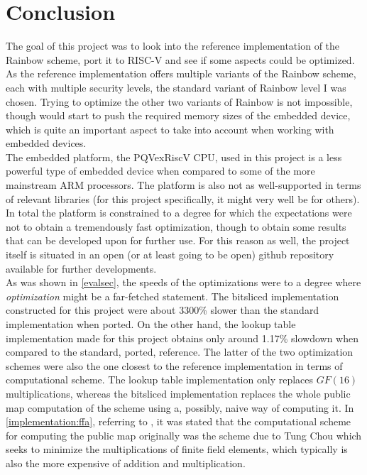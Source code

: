 \section{Conclusion}
The goal of this project was to look into the reference implementation of the Rainbow scheme, port it to RISC-V and see if some aspects could be optimized. As the reference implementation offers multiple variants of the Rainbow scheme, each with multiple security levels, the standard variant of Rainbow level I was chosen. Trying to optimize the other two variants of Rainbow is not impossible, though would start to push the required memory sizes of the embedded device, which is quite an important aspect to take into account when working with embedded devices.
\medskip\\
The embedded platform, the PQVexRiscV CPU, used in this project is a less powerful type of embedded device when compared to some of the more mainstream ARM processors. The platform is also not as well-supported in terms of relevant libraries (for this project specifically, it might very well be for others). In total the platform is constrained to a degree for which the expectations were not to obtain a tremendously fast optimization, though to obtain some results that can be developed upon for further use. For this reason as well, the project itself is situated in an open (or at least going to be open) github repository available for further developments.
\medskip\\
As was shown in \cref{evalsec}, the speeds of the optimizations were to a degree where \emph{optimization} might be a far-fetched statement. The bitsliced implementation constructed for this project were about 3300\% slower than the standard implementation when ported. On the other hand, the lookup table implementation made for this project obtains only around 1.17\% slowdown when compared to the standard, ported, reference. The latter of the two optimization schemes were also the one closest to the reference implementation in terms of computational scheme. The lookup table implementation only replaces $GF(16)$ multiplications, whereas the bitsliced implementation replaces the whole public map computation of the scheme using a, possibly, naive way of computing it. In \cref{implementation:ffa}, referring to \cite{rainbownist}, it was stated that the computational scheme for computing the public map originally was the scheme due to Tung Chou which seeks to minimize the multiplications of finite field elements, which typically is also the more expensive of addition and multiplication.
